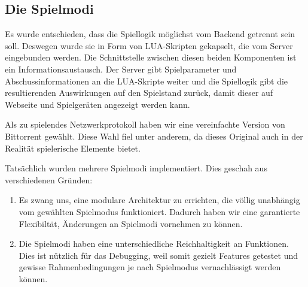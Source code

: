 \subsection{Die Spielmodi}
\label{sec:architektur-spielmodi}

Es wurde entschieden, dass die Spiellogik möglichst vom Backend getrennt sein soll.
Deswegen wurde sie in Form von LUA-Skripten gekapselt, die vom Server eingebunden werden.
Die Schnittstelle zwischen diesen beiden Komponenten ist ein Informationsaustausch.
Der Server gibt Spielparameter und Abschussinformationen an die LUA-Skripte weiter und die
Spiellogik gibt die resultierenden Auswirkungen auf den Spielstand zurück, damit dieser auf Webseite
und Spielgeräten angezeigt werden kann.

Als zu spielendes Netzwerkprotokoll haben wir eine vereinfachte Version von Bittorrent gewählt.
Diese Wahl fiel unter anderem, da dieses Original auch in der Realität spielerische Elemente bietet.

Tatsächlich wurden mehrere Spielmodi implementiert.
Dies geschah aus verschiedenen Gründen:
\begin{enumerate}
  \item
    Es zwang uns, eine modulare Architektur zu errichten, die völlig unabhängig vom gewählten
    Spielmodus funktioniert.
    Dadurch haben wir eine garantierte Flexibiltät, Änderungen an Spielmodi vornehmen zu können.
  \item
    Die Spielmodi haben eine unterschiedliche Reichhaltigkeit an Funktionen.
    Dies ist nützlich für das Debugging, weil somit gezielt Features getestet und gewisse
    Rahmenbedingungen je nach Spielmodus vernachlässigt werden können.
\end{enumerate}
